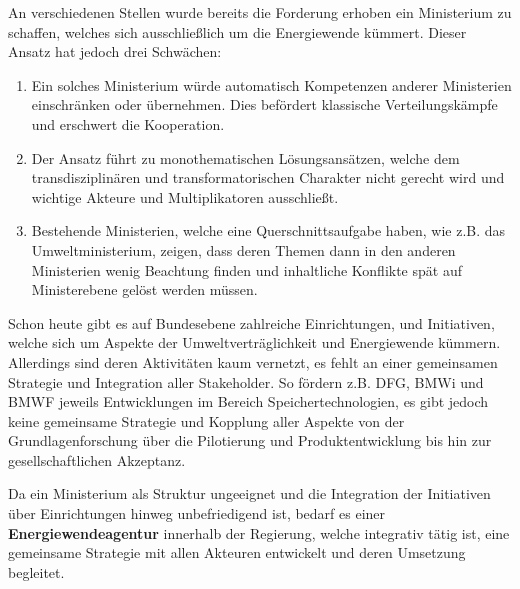 An verschiedenen Stellen wurde bereits die Forderung erhoben ein Ministerium zu schaffen, welches sich ausschließlich um die Energiewende kümmert.
Dieser Ansatz hat jedoch drei Schwächen:
\begin{enumerate}
\item Ein solches Ministerium würde automatisch Kompetenzen anderer Ministerien einschränken oder übernehmen. Dies befördert klassische Verteilungskämpfe und erschwert die Kooperation.

\item Der Ansatz führt zu monothematischen Lösungsansätzen, welche dem transdisziplinären und transformatorischen Charakter nicht gerecht wird und wichtige Akteure und Multiplikatoren ausschließt.

\item Bestehende Ministerien, welche eine Querschnittsaufgabe haben, wie z.B. das Umweltministerium, zeigen, dass deren Themen dann in den anderen Ministerien wenig Beachtung finden und inhaltliche Konflikte spät auf Ministerebene gelöst werden müssen.
\end{enumerate}

Schon heute gibt es auf Bundesebene zahlreiche Einrichtungen, und Initiativen, welche sich um Aspekte der Umweltverträglichkeit und Energiewende kümmern.
Allerdings sind deren Aktivitäten kaum vernetzt, es fehlt an einer gemeinsamen Strategie und Integration aller Stakeholder.
So fördern z.B. DFG, BMWi und BMWF jeweils Entwicklungen im Bereich Speichertechnologien, es gibt jedoch keine gemeinsame Strategie und Kopplung aller Aspekte von der Grundlagenforschung über die Pilotierung und Produktentwicklung bis hin zur gesellschaftlichen Akzeptanz.

Da ein Ministerium als Struktur ungeeignet und die Integration der Initiativen über Einrichtungen hinweg unbefriedigend ist, bedarf es einer \textbf{Energiewendeagentur} innerhalb der Regierung, welche integrativ tätig ist, eine gemeinsame Strategie mit allen Akteuren entwickelt und deren Umsetzung begleitet.

